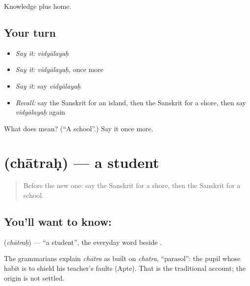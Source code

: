\begin{grammarlens}[title={What you've built}]
Knowledge plus home.
\end{grammarlens}

\subsection*{Your turn}
\begin{itemize}
\raggedright
  \item \emph{Say it:} \emph{vidyālayaḥ}
  \item \emph{Say it:} \emph{vidyālayaḥ}, once more
  \item \emph{Say it:} say \emph{vidyālayaḥ}
  \item \emph{Recall:} say the Sanskrit for an island, then the Sanskrit for a shore, then say \emph{vidyālayaḥ} again
\end{itemize}

\begin{tcolorbox}[breakable,colback=teal!4,colframe=teal!35!black,title={Before you move on}]
What does  mean? (\textquotedblleft{}A school\textquotedblright{}.) Say it once more.
\end{tcolorbox}
\section[\texorpdfstring{\sk{छात्रः} (chātraḥ)}{छात्रः (chātraḥ)}]{ (chātraḥ) — a student}

\label{lesson:SA-C83-student}



\begin{quote}
Before the new one: say the Sanskrit for a shore, then the Sanskrit for a school.
\end{quote}

\subsection*{You'll want to know: }
\textbf{} (\emph{chātraḥ}) — \textquotedblleft{}a student\textquotedblright{}, the everyday word beside \textbf{}.

\begin{cousinweb}
The grammarians explain \emph{chātra} as built on \emph{chatra}, \textquotedblleft{}parasol\textquotedblright{}: the pupil whose habit is to shield his teacher's faults (Apte). That is the traditional account; the origin is not settled.
\end{cousinweb}

